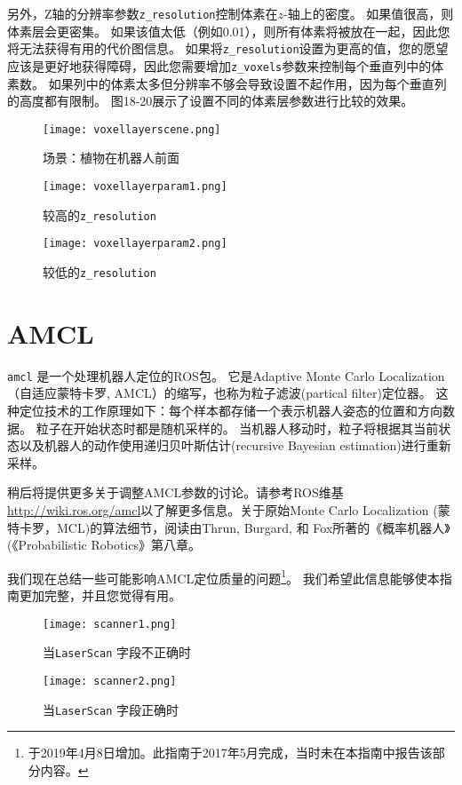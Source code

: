 另外，Z轴的分辨率参数\texttt{z_resolution}控制体素在$ z $-轴上的密度。 如果值很高，则体素层会更密集。 
如果该值太低（例如0.01），则所有体素将被放在一起，因此您将无法获得有用的代价图信息。 
如果将\texttt{z_resolution}设置为更高的值，您的愿望应该是更好地获得障碍，因此您需要增加\texttt{z_voxels}参数来控制每个垂直列中的体素数。 如果列中的体素太多但分辨率不够会导致设置不起作用，因为每个垂直列的高度都有限制。 
图18-20展示了设置不同的体素层参数进行比较的效果。

\begin{figure}[!h]
\end{figure}

\begin{figure}[!h]
	\texttt{[image: voxellayerscene.png]}
	\caption{场景：植物在机器人前面}
	\endminipage\hfill
	\texttt{[image: voxellayerparam1.png]}
	\caption{较高的\texttt{z_resolution}}
	\endminipage\hfill
	\texttt{[image: voxellayerparam2.png]}
	\caption{较低的\texttt{z_resolution}}
	\endminipage\hfill
\end{figure}


\section[AMCL]{AMCL}

\texttt{amcl} 是一个处理机器人定位的ROS包。 它是Adaptive Monte Carlo Localization（自适应蒙特卡罗, AMCL）的缩写，也称为粒子滤波(partical filter)定位器。 这种定位技术的工作原理如下：每个样本都存储一个表示机器人姿态的位置和方向数据。 
粒子在开始状态时都是随机采样的。 
当机器人移动时，粒子将根据其当前状态以及机器人的动作使用递归贝叶斯估计(recursive Bayesian estimation)进行重新采样。

稍后将提供更多关于调整AMCL参数的讨论。请参考ROS维基\url{http://wiki.ros.org/amcl}以了解更多信息。关于原始Monte Carlo Localization (蒙特卡罗，MCL)的算法细节，阅读由Thrun, Burgard, 和 Fox所著的《概率机器人》(《Probabilistic Robotics》第八章\cite{thrun2005probabilistic}。

我们现在总结一些可能影响AMCL定位质量的问题\footnote{于2019年4月8日增加。此指南于2017年5月完成，当时未在本指南中报告该部分内容。}。 我们希望此信息能够使本指南更加完整，并且您觉得有用。

\begin{figure}[!tb]
	\texttt{[image: scanner1.png]}
	\caption{当\texttt{LaserScan} 字段不正确时}
	\label{fig:scanner1}
	\endminipage\hfill
	\texttt{[image: scanner2.png]}
	\caption{当\texttt{LaserScan} 字段正确时}
	\label{fig:scanner2}
	\endminipage\hfill
\end{figure}

